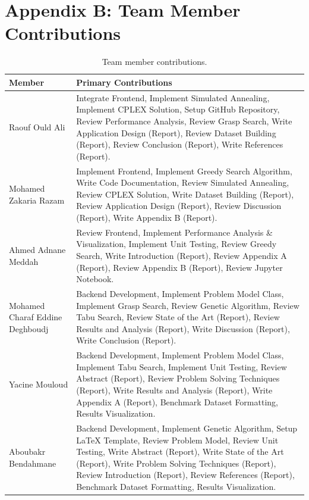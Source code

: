 \section*{Appendix B: Team Member Contributions}

\begin{table}[h]
\centering
\caption{Team member contributions.}
\label{tab:contributions}
\begin{tabular}{|p{3cm}|p{10cm}|}
\hline
\textbf{Member} & \textbf{Primary Contributions} \\
\hline
Raouf Ould Ali & Integrate Frontend, Implement Simulated Annealing, Implement CPLEX Solution, Setup GitHub Repository, Review Performance Analysis, Review Grasp Search, Write Application Design (Report), Review Dataset Building (Report), Review Conclusion (Report), Write References (Report). \\
\hline
Mohamed Zakaria Razam & Implement Frontend, Implement Greedy Search Algorithm, Write Code Documentation, Review Simulated Annealing, Review CPLEX Solution, Write Dataset Building (Report), Review Application Design (Report), Review Discussion (Report), Write Appendix B (Report). \\
\hline
Ahmed Adnane Meddah & Review Frontend, Implement Performance Analysis \& Visualization, Implement Unit Testing, Review Greedy Search, Write Introduction (Report), Review Appendix A (Report), Review Appendix B (Report), Review Jupyter Notebook. \\
\hline
Mohamed Charaf Eddine Deghboudj & Backend Development, Implement Problem Model Class, Implement Grasp Search, Review Genetic Algorithm, Review Tabu Search, Review State of the Art (Report), Review Results and Analysis (Report), Write Discussion (Report), Write Conclusion (Report). \\
\hline
Yacine Mouloud & Backend Development, Implement Problem Model Class, Implement Tabu Search, Implement Unit Testing, Review Abstract (Report), Review Problem Solving Techniques (Report), Write Results and Analysis (Report), Write Appendix A (Report), Benchmark Dataset Formatting, Results Visualization. \\
\hline
Aboubakr Bendahmane & Backend Development, Implement Genetic Algorithm, Setup \LaTeX{} Template, Review Problem Model, Review Unit Testing, Write Abstract (Report), Write State of the Art (Report), Write Problem Solving Techniques (Report), Review Introduction (Report), Review References (Report), Benchmark Dataset Formatting, Results Visualization. \\
\hline
\end{tabular}
\end{table}